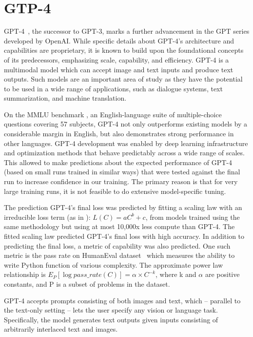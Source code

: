 \section{GTP-4}
\label{subsec:gpt-4}

GPT-4~\cite{gpt4}, the successor to GPT-3, marks a further advancement in the GPT series developed by OpenAI. While specific details about GPT-4's architecture and capabilities are proprietary, it is known to build upon the foundational concepts of its predecessors, emphasizing scale, capability, and efficiency.
GPT-4 is a multimodal model which can accept image and text inputs and produce text outputs.
Such models are an important area of study as they have the potential to be used in a wide range of applications, such as dialogue systems, text summarization, and machine translation.

On the MMLU benchmark \cite{hendrycks2021measuring}, an English-language suite of multiple-choice questions covering 57 subjects, GPT-4 not only outperforms existing models by a considerable margin in English, but also demonstrates strong performance in other languages.
GPT-4 development was enabled by deep learning infrastructure and optimization methods that behave predictably across a wide range of scales.
This allowed to make predictions about the expected performance of GPT-4 (based on small runs trained in similar ways) that were tested against the final run to increase confidence in our training.
The primary reason is that for very large training runs, it is not feasible to do extensive model-specific tuning.

The prediction GPT-4’s final loss was predicted by fitting a scaling law with an irreducible loss term (as in \cite{henighan2020scaling}): \(L(C) = aC^b + c\), from models trained using the same methodology but using at most 10,000x less compute than GPT-4.
The fitted scaling law predicted GPT-4’s final loss with high accuracy.
In addition to predicting the final loss, a metric of capability was also predicted.
One such metric is the pass rate on HumanEval dataset~\cite{chen2021evaluating} which measures the ability to write Python function of various complexity.
The approximate power law relationship is \(E_P [\log{pass\_rate(C)}] = \alpha \times C^{-k}\), where k and \(\alpha\) are positive constants, and P is a subset of problems in the dataset.

GPT-4 accepts prompts consisting of both images and text, which -- parallel to the text-only setting -- lets the user specify any vision or language task.
Specifically, the model generates text outputs given inputs consisting of arbitrarily interlaced text and images.

